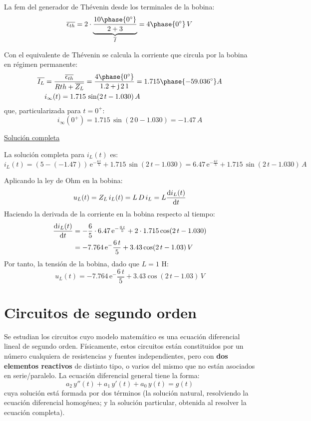 \begin{example}
	La fem del generador de Thévenin desde los terminales de la bobina:
	\begin{equation*}
	    \overline{\epsilon_{th}}=2\cdot \underbrace{\dfrac{10\phase{0^\circ}}{2+3}}_{\overline{I}}=4\phase{0^\circ}\,V
	\end{equation*}
	
	Con el equivalente de Thévenin se calcula la corriente que circula por la bobina en régimen permanente:
	\begin{align*}
	    \overline{I_L}&=\dfrac{\overline{\epsilon_{th}}}{R{th}+\overline{Z_L}}=\dfrac{4\phase{0^\circ}}{1.2+\mathrm{j}\,2\,1}=1.715\phase{-59.036^\circ} A\\
	    &i_\infty(t)=1.715\,\sin(2\,t-1.030)\,A
	\end{align*}
	que, particularizada para $t=0^+$:
	\begin{equation*}
	    i_\infty(0^+)=1.715\,\sin(2\,0-1.030)=-1.47\,A
	\end{equation*}
	
	\underline{Solución completa}
	
	La solución completa para $i_L(t)$ es:
	\begin{equation*}
	    i_L(t)=(5-(-1.47))\,\mathrm{e}^{-\frac{6\,t}{5}}+1.715\,\sin(2\,t-1.030)=6.47\,\mathrm{e}^{-\frac{6\,t}{5}}+1.715\,\sin(2\,t-1.030)\,A
	\end{equation*}
	
	Aplicando la ley de Ohm en la bobina:
	\begin{equation*}
	    u_L(t)=Z_L\,i_L(t)=L\,D\,i_L=L\diff{i_L(t)}{t}
	\end{equation*}
	Haciendo la derivada de la corriente en la bobina respecto al tiempo:
	\begin{align*}
	    \diff{i_L(t)}{t}&=-\dfrac{6}{5}\cdot 6.47\,\mathrm{e}^{-\frac{6\,t}{5}}+2\cdot 1.715\cos(2\,t-1.030)\\
	    &=-7.764\,\mathrm{e}^-{\frac{6\,t}{5}}+3.43\cos(2\,t-1.03)\,V
	\end{align*}
	Por tanto, la tensión de la bobina, dado que $L=1$ H: 
	\begin{equation*}
	    u_L(t)=-7.764\,\mathrm{e}^-{\frac{6\,t}{5}}+3.43\cos(2\,t-1.03)\,V
	\end{equation*}
	\end{example}
	
	\section{Circuitos de segundo orden}
	Se estudian los circuitos cuyo modelo matemático es una ecuación diferencial lineal de segundo orden. Físicamente, estos circuitos están constituidos por un número cualquiera de resistencias y fuentes independientes, pero con \textbf{dos elementos reactivos} de distinto tipo, o varios del mismo que no están asociados en serie/paralelo. La ecuación diferencial general tiene la forma: 
	\begin{equation*}
	    a_2\,y''(t)+a_1\,y'(t)+a_0\,y(t)=g(t)
	\end{equation*}
	cuya solución está formada por dos términos (la solución natural, resolviendo la ecuación diferencial homogénea; y la solución particular, obtenida al resolver la ecuación completa).
	
